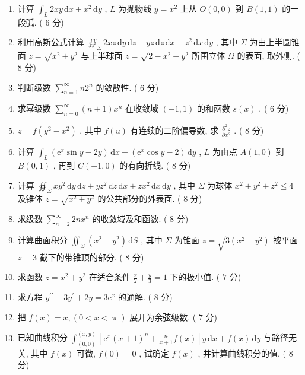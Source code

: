 \documentclass[cn,11pt,fancy,hide]{elegantbook}
\newcommand{\ee}{\mathrm{e}}
\newcommand{\dd}{\,\mathrm{d}}
\renewcommand{\leq}{\leqslant}
\begin{document}
\begin{enumerate}
	\item 计算 $\int_{L} 2 x y \dd x+x^{2} \dd y$ , $L$  为抛物线 $y=x^{2}$ 上从 $O(0,0)$ 到 $B(1,1)$ 的一段弧. ( $6$ 分)
	
	\item 利用高斯公式计算 $\oiint_{\Sigma} 2 x z \dd y \dd z+y z \dd z \dd x-z^{2} \dd x \dd y$ , 其中 $\Sigma$ 为由上半圆锥面 $z=\sqrt{x^{2}+y^{2}}$ 与上半球面 $z=\sqrt{2-x^{2}-y^{2}}$ 所围立体 $\Omega$ 的表面, 取外侧. ( $8$ 分)
	
	\item  判断级数 $\sum_{n=1}^{\infty} n 2^{n}$ 的敛散性. ( $6$ 分)
	
	\item  求幂级数 $\sum_{n=0}^{\infty}(n+1) x^{n}$ 在收敛域 $(-1,1)$ 的和函数 $s(x)$ . ( $6$ 分)
	
	\item $z=f\left(y^{2}-x^{2}\right)$ , 其中 $f(u)$ 有连续的二阶偏导数, 求 $\frac{\partial^{2} z}{\partial x^{2}}$ . ( $8$ 分)
	
	\item 计算 $\int_{L}\left(\ee^{x} \sin y-2 y\right) \dd x+\left(\ee^{x} \cos y-2\right) \dd y$ , $L$ 为由点 $A(1,0)$ 到 $B(0,1)$ , 再到 $C(-1,0)$ 的有向折线. ( $8$ 分)
	
	\item 计算 $\oiint_{\Sigma} x y^{2} \dd y \dd z+y z^{2} \dd z \dd x+z x^{2} \dd x \dd y$ , 其中 $\Sigma$ 为球体 $x^{2}+y^{2}+z^{2} \leq 4$ 及锥体 $z=\sqrt{x^{2}+y^{2}}$ 的公共部分的外表面. ( $8$ 分)
	
	\item 求级数 $\sum_{n=2}^{\infty} 2 n x^{n}$ 的收敛域及和函数. ( $8$ 分)
	
	\item 计算曲面积分 $\iint_{\Sigma}\left(x^{2}+y^{2}\right) \dd S$ , 其中 $\Sigma$ 为锥面 $z=\sqrt{3\left(x^2+y^2\right)}$ 被平面 $z=3$ 截下的带锥顶的部分. ( $8$ 分)
	
	\item 求函数 $z=x^2+y^2$ 在适合条件 $\frac{x}{2}+\frac{y}{3}=1$ 下的极小值. ( $7$ 分)
	
	\item 求方程 $y^{\prime \prime}-3 y^{\prime}+2 y=3 \ee^{x}$ 的通解. ( $8$ 分)
	
	\item 把 $f(x)=x,(0<x<\uppi)$ 展开为余弦级数. ( $7$ 分)
	
	\item 已知曲线积分 $\int_{(0,0)}^{(x, y)}\left[\ee^{x}(x+1)^{n}+\frac{n}{x+1} f(x)\right] y \dd x+f(x) \dd y$ 与路径无关, 其中 $f(x)$ 可微, $f(0)=0$ , 试确定 $f(x)$ , 并计算曲线积分的值. ( $8$ 分)
\end{enumerate}
\end{document}

